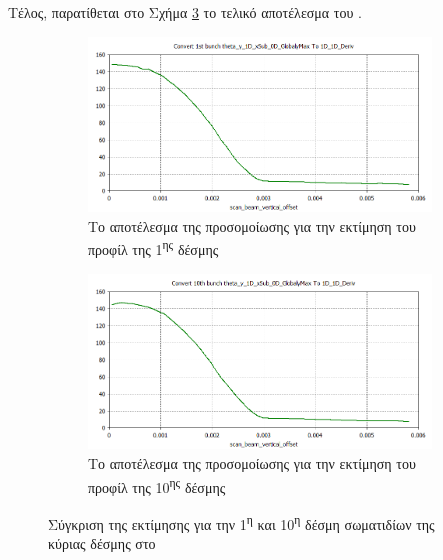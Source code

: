 Τέλος, παρατίθεται στο Σχήμα \ref{fig:CST-EBS-implementation} το τελικό αποτέλεσμα του . 

\begin{figure}[tph]	
	\centering
	\begin{subfigure}{\textwidth}
		\includegraphics[width=\linewidth]{figures/CST-EBS-implementation/CST-EBS-1st-bunch-thetay}
		\centering
		\caption{Το αποτέλεσμα της προσομοίωσης για την εκτίμηση του προφίλ της 1\textsuperscript{ης} δέσμης}
		\label{fig:CST-EBS-1st-bunch-thetay}
	\end{subfigure}
	\hfill
	\begin{subfigure}{\textwidth}
		\includegraphics[width=\linewidth]{figures/CST-EBS-implementation/CST-EBS-10th-bunch-thetay}
		\centering
		\caption{Το αποτέλεσμα της προσομοίωσης για την εκτίμηση του προφίλ της 10\textsuperscript{ης} δέσμης}
		\label{fig:CST-EBS-10th-bunch-thetay}
	\end{subfigure}
	\caption{Σύγκριση της εκτίμησης για την 1\textsuperscript{η} και 10\textsuperscript{η} δέσμη σωματιδίων της κύριας δέσμης στο }
	\label{fig:CST-EBS-implementation}
\end{figure}

